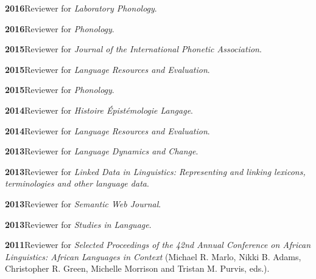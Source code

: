 \documentclass[11pt]{article}
\newcommand{\hangpara}{
 \setlength{\parindent}{0in} %
 \hangindent=0.42in %
}
\begin{document}
\vskip 6pt
\hangpara
{\bf 2016}\hspace{1ex}Reviewer for \textit{Laboratory Phonology}.

\vskip 6pt
\hangpara
{\bf 2016}\hspace{1ex}Reviewer for \textit{Phonology}.

\vskip 6pt
\hangpara
{\bf 2015}\hspace{1ex}Reviewer for \textit{Journal of the International Phonetic Association}.


\vskip 6pt
\hangpara
{\bf 2015}\hspace{1ex}Reviewer for \textit{Language Resources and Evaluation}.

\vskip 6pt
\hangpara
{\bf 2015}\hspace{1ex}Reviewer for \textit{Phonology}.

\vskip 6pt
\hangpara
{\bf 2014}\hspace{1ex}Reviewer for \textit{Histoire {\'E}pist{\'e}mologie Langage}.

\vskip 6pt
\hangpara
{\bf 2014}\hspace{1ex}Reviewer for \textit{Language Resources and Evaluation}.

\vskip 6pt
\hangpara
{\bf 2013}\hspace{1ex}Reviewer for \textit{Language Dynamics and Change}.

\vskip 6pt
\hangpara
{\bf 2013}\hspace{1ex}Reviewer for \textit{Linked Data in Linguistics: Representing and linking lexicons, terminologies and other language data}.

\vskip 6pt
\hangpara
{\bf 2013}\hspace{1ex}Reviewer for \textit{Semantic Web Journal}.

\vskip 6pt
\hangpara
{\bf 2013}\hspace{1ex}Reviewer for \textit{Studies in Language}.

\vskip 6pt
\hangpara
{\bf 2011}\hspace{1ex}Reviewer for \textit{Selected Proceedings of the 42nd Annual Conference on African Linguistics: African Languages in Context} (Michael R. Marlo, Nikki B. Adams, Christopher R. Green, Michelle Morrison and Tristan M. Purvis, eds.).
\end{document}
